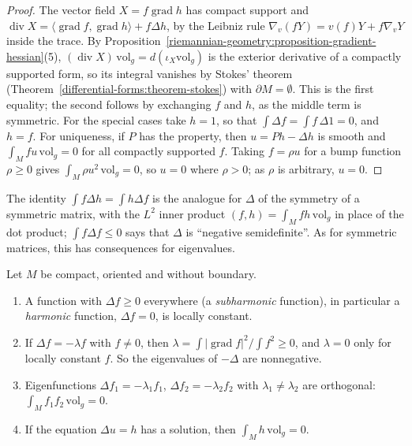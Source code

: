 \begin{proof}
The vector field $X = f\operatorname{grad}h$ has compact support and $\operatorname{div}X = \langle\operatorname{grad}f, \operatorname{grad}h\rangle + f\Delta h$, by the Leibniz rule
$\nabla_v(fY) = v(f)Y + f\nabla_vY$ inside the trace. By Proposition~\ref{riemannian-geometry:proposition-gradient-hessian}(5), $(\operatorname{div}X)\,\mathrm{vol}_g = d(\iota_X\mathrm{vol}_g)$ is
the exterior derivative of a compactly supported form, so its integral vanishes by Stokes' theorem (Theorem~\ref{differential-forms:theorem-stokes}) with $\partial M = \emptyset$. This is
the first equality; the second follows by exchanging $f$ and $h$, as the middle term is symmetric. For the special cases take $h = 1$, so that $\int\Delta f = \int f\,\Delta1 = 0$, and $h = f$. For uniqueness, if $P$ has the property, then $u = Ph - \Delta h$ is smooth and $\int_Mfu\,\mathrm{vol}_g = 0$ for all
compactly supported $f$. Taking $f = \rho u$ for a bump function $\rho \geq 0$ gives $\int_M\rho u^2\,\mathrm{vol}_g = 0$, so $u = 0$ where $\rho > 0$; as $\rho$ is arbitrary, $u = 0$.
\end{proof}

The identity $\int f\Delta h = \int h\Delta f$ is the analogue for $\Delta$ of the symmetry of a symmetric matrix, with the $L^2$ inner product $(f, h) = \int_Mfh\,\mathrm{vol}_g$ in place of
the dot product; $\int f\Delta f \leq 0$ says that $\Delta$ is ``negative semidefinite''. As for symmetric matrices, this has consequences for eigenvalues.

\begin{corollary}\label{riemannian-geometry:corollary-laplacian-compact}
Let $M$ be compact, oriented and without boundary.
\begin{enumerate}
\item A function with $\Delta f \geq 0$ everywhere (a \emph{subharmonic} function), in particular a \emph{harmonic} function, $\Delta f = 0$, is locally constant.
\item If $\Delta f = -\lambda f$ with $f \neq 0$, then $\lambda = \int|\operatorname{grad}f|^2/\int f^2 \geq 0$, and $\lambda = 0$ only for locally constant $f$. So the eigenvalues of $-\Delta$
are nonnegative.
\item Eigenfunctions $\Delta f_1 = -\lambda_1f_1$, $\Delta f_2 = -\lambda_2f_2$ with $\lambda_1 \neq \lambda_2$ are orthogonal: $\int_Mf_1f_2\,\mathrm{vol}_g = 0$.
\item If the equation $\Delta u = h$ has a solution, then $\int_Mh\,\mathrm{vol}_g = 0$.
\end{enumerate}
\end{corollary}

